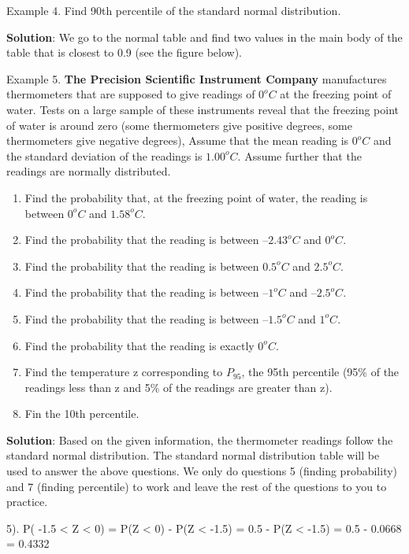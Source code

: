\documentclass[
]{book}
\begin{document}
Example 4. Find 90th percentile of the standard normal distribution.

\textbf{Solution}: We go to the normal table and find two values in the main body of the table that is closest to 0.9 (see the figure below).

\hfill\break

Example 5. \textbf{The Precision Scientific Instrument Company} manufactures thermometers that are supposed to give readings of \(0^oC\) at the freezing point of water. Tests on a large sample of these instruments reveal that the freezing point of water is around zero (some thermometers give positive degrees, some thermometers give negative degrees), Assume that the mean reading is \(0^oC\) and the standard deviation of the readings is \(1.00^oC\). Assume further that the readings are normally distributed.

\begin{enumerate}
\def\labelenumi{\arabic{enumi}.}
\item
  Find the probability that, at the freezing point of water, the reading is between \(0^oC\) and \(1.58^oC\).
\item
  Find the probability that the reading is between \(–2.43^oC\) and \(0^oC\).
\item
  Find the probability that the reading is between \(0.5^oC\) and \(2.5^oC\).
\item
  Find the probability that the reading is between \(–1^oC\) and \(–2.5^oC\).
\item
  Find the probability that the reading is between \(–1.5^oC\) and \(1^oC\).
\item
  Find the probability that the reading is exactly \(0^oC\).
\item
  Find the temperature z corresponding to \(P_{95}\), the 95th percentile (95\% of the readings less than z and 5\% of the readings are greater than z).
\item
  Fin the 10th percentile.
\end{enumerate}

\textbf{Solution}: Based on the given information, the thermometer readings follow the standard normal distribution. The standard normal distribution table will be used to answer the above questions. We only do questions 5 (finding probability) and 7 (finding percentile) to work and leave the rest of the questions to you to practice.

5). P( -1.5 \textless{} Z \textless{} 0) = P(Z \textless{} 0) - P(Z \textless{} -1.5) = 0.5 - P(Z \textless{} -1.5) = 0.5 - 0.0668 = 0.4332
\end{document}
